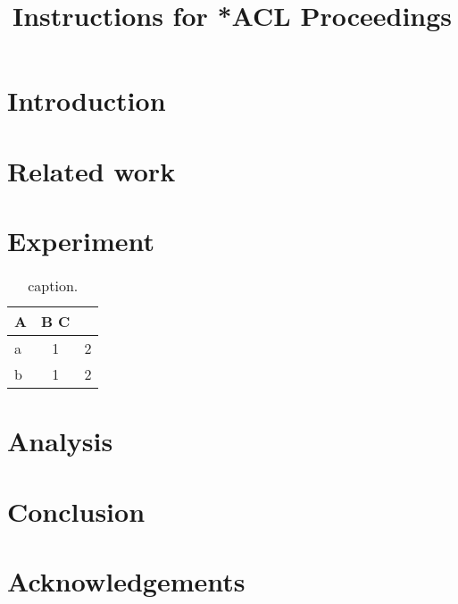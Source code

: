 \documentclass[11pt]{article}
\title{Instructions for *ACL Proceedings}
\author{}
\begin{document}
\maketitle
\begin{abstract}

\end{abstract}

\section{Introduction}

\section{Related work}

\section{Experiment}

\begin{table}[t]
\centering
\small
\begin{tabular}{lcc}
\toprule
A & B C \\
\midrule
a & 1 & 2 \\
b & 1 & 2 \\
\bottomrule
\end{tabular}
\caption{caption.}
\label{tbl:data_size}
\end{table}

\section{Analysis}

\section{Conclusion}

\section*{Acknowledgements}






\appendix
\end{document}
